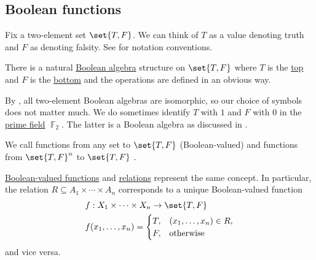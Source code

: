\subsection{Boolean functions}\label{subsec:boolean_functions}

\begin{definition}\label{def:boolean_value}
  Fix a two-element set \( \set{ T, F } \). We can think of \( T \) as a value denoting truth and \( F \) as denoting falsity. See  for notation conventions.

  There is a natural \hyperref[def:boolean_algebra]{Boolean algebra} structure on \( \set{ T, F } \) where \( T \) is the \hyperref[def:extremal_points/top_and_bottom]{top} and \( F \) is the \hyperref[def:extremal_points/top_and_bottom]{bottom} and the operations are defined in an obvious way.

  By , all two-element Boolean algebras are isomorphic, so our choice of symbols does not matter much. We do sometimes identify \( T \) with \( 1 \) and \( F \) with \( 0 \) in the \hyperref[thm:finite_fields]{prime field} \( \BbbF_2 \). The latter is a Boolean algebra as discussed in .
\end{definition}

\begin{definition}\label{def:boolean_function}
  We call functions from any set to \( \set{ T, F } \) (Boolean-valued)  and functions from \( \set{ T, F }^n \) to \( \set{ T, F } \) .
\end{definition}

\begin{remark}\label{rem:boolean_valued_functions_and_predicates}
  \hyperref[def:boolean_function]{Boolean-valued functions} and \hyperref[def:relation]{relations} represent the same concept. In particular, the relation \( R \subseteq A_1 \times \cdots \times A_n \) corresponds to a unique Boolean-valued function
  \begin{equation*}
    \begin{aligned}
      &f: X_1 \times \cdots \times X_n \to \set{ T, F } \\
      &f(x_1, \ldots, x_n) = \begin{cases}
        T, &(x_1, \ldots, x_n) \in R, \\
        F, &\T{otherwise}
      \end{cases}
    \end{aligned}
  \end{equation*}
  and vice versa.
\end{remark}

